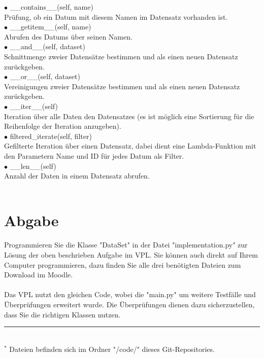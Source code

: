 \documentclass[12pt]{article}
\begin{document}
$\bullet$ \_\_contains\_\_(self, name)\\
\hspace*{1cm} Prüfung, ob ein Datum mit diesem Namen im Datensatz vorhanden ist.\\
$\bullet$ \_\_getitem\_\_(self, name)\\
\hspace*{1cm} Abrufen des Datums über seinen Namen.\\ 
$\bullet$ \_\_and\_\_(self, dataset)\\
\hspace*{1cm} Schnittmenge zweier Datensätze bestimmen und als einen neuen Datensatz zurückgeben.\\
$\bullet$ \_\_or\_\_(self, dataset)\\
\hspace*{1cm} Vereinigungen zweier Datensätze bestimmen und als einen neuen Datensatz zurückgeben.\\
$\bullet$ \_\_iter\_\_(self)\\
\hspace*{1cm} Iteration über alle Daten den Datensatzes (es ist möglich eine Sortierung für die Reihenfolge der Iteration anzugeben).\\ 
$\bullet$ filtered\_iterate(self, filter)\\
\hspace*{1cm} Gefilterte Iteration über einen Datensatz, dabei dient eine Lambda-Funktion mit den Parametern Name und ID für jedes Datum als Filter.\\
$\bullet$ \_\_len\_\_(self)\\
\hspace*{1cm} Anzahl der Daten in einem Datensatz abrufen.\\
\\
\section{Abgabe}
Programmieren Sie die Klasse "DataSet" in der Datei "implementation.py" zur Lösung der oben beschrieben Aufgabe im VPL.
Sie können auch direkt auf Ihrem Computer programmieren, dazu finden Sie alle drei benötigten Dateien zum Download im Moodle.\\
\\
Das VPL nutzt den gleichen Code, wobei die "main.py" um weitere Testfälle und Überprüfungen erweitert wurde.
Die Überprüfungen dienen dazu sicherzustellen, dass Sie die richtigen Klassen nutzen.\\
%
\hrule\hfill\\[0.2cm]
$^*$ Dateien befinden sich im Ordner "/code/" dieses Git-Repositories.\\
\end{document}
